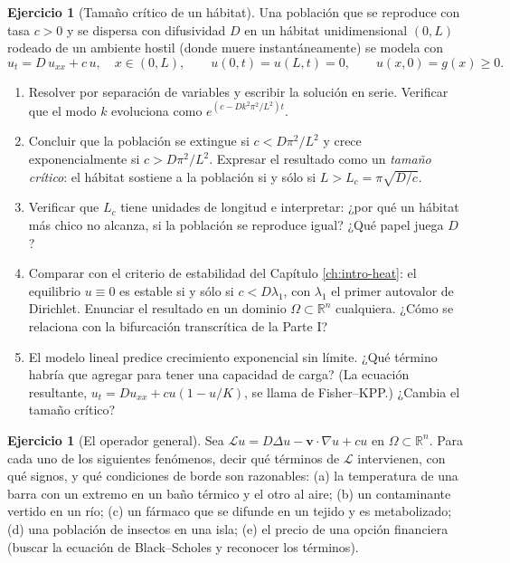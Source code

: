 \documentclass[12pt, a4paper]{amsbook}
\newcommand{\R}{{\mathbb R}}
\newcommand{\LL}{{\mathcal L}}
\newcommand{\vv}{{\mathbf v}}
\theoremstyle{remark}
\theoremstyle{definition}
\newtheorem{ejer}[teo]{Ejercicio}
\numberwithin{section}{chapter}
\numberwithin{subsection}{section}
\numberwithin{equation}{section}
\numberwithin{figure}{chapter}
\begin{document}
\begin{ejer}[Tamaño crítico de un hábitat]\label{ejer:habitat}
Una población que se reproduce con tasa $c>0$ y se dispersa con difusividad $D$ en un hábitat unidimensional $(0,L)$ rodeado de un ambiente hostil (donde muere instantáneamente) se modela con
$$
u_t = D\,u_{xx} + c\,u,\quad x\in(0,L),\qquad u(0,t)=u(L,t)=0,\qquad u(x,0)=g(x)\ge 0 .
$$
\begin{enumerate}
\item Resolver por separación de variables y escribir la solución en serie. Verificar que el modo $k$ evoluciona como $e^{(c - D k^2\pi^2/L^2)t}$.
\item Concluir que la población se extingue si $c<D\pi^2/L^2$ y crece exponencialmente si $c>D\pi^2/L^2$. Expresar el resultado como un \emph{tamaño crítico}: el hábitat sostiene a la población si y sólo si $L>L_c = \pi\sqrt{D/c}$.
\item Verificar que $L_c$ tiene unidades de longitud e interpretar: ¿por qué un hábitat más chico no alcanza, si la población se reproduce igual? ¿Qué papel juega $D$?
\item Comparar con el criterio de estabilidad del Capítulo \ref{ch:intro-heat}: el equilibrio $u\equiv 0$ es estable si y sólo si $c<D\lambda_1$, con $\lambda_1$ el primer autovalor de Dirichlet. Enunciar el resultado en un dominio $\Omega\subset\R^n$ cualquiera. ¿Cómo se relaciona con la bifurcación transcrítica de la Parte I?
\item El modelo lineal predice crecimiento exponencial sin límite. ¿Qué término habría que agregar para tener una capacidad de carga? (La ecuación resultante, $u_t = Du_{xx} + cu(1-u/K)$, se llama de Fisher--KPP.) ¿Cambia el tamaño crítico?
\end{enumerate}
\end{ejer}

\begin{ejer}[El operador general]
Sea $\LL u = D\Delta u - \vv\cdot\nabla u + cu$ en $\Omega\subset\R^n$. Para cada uno de los siguientes fenómenos, decir qué términos de $\LL$ intervienen, con qué signos, y qué condiciones de borde son razonables: (a) la temperatura de una barra con un extremo en un baño térmico y el otro al aire; (b) un contaminante vertido en un río; (c) un fármaco que se difunde en un tejido y es metabolizado; (d) una población de insectos en una isla; (e) el precio de una opción financiera (buscar la ecuación de Black--Scholes y reconocer los términos).
\end{ejer}
\end{document}
